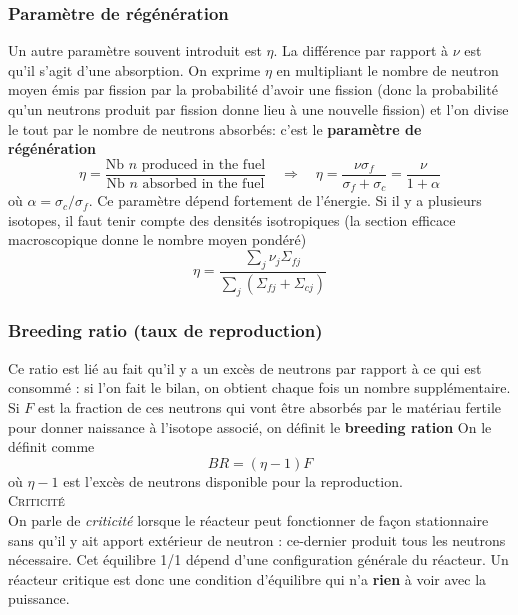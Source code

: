 \subsubsection{Paramètre de régénération}
Un autre paramètre souvent introduit est $\eta$. La différence par rapport à $\nu$ est qu'il 
s'agit d'une absorption. On exprime $\eta$ en multipliant le nombre de neutron moyen émis par
fission par la probabilité d'avoir une fission (donc la probabilité qu'un neutrons produit par 
fission donne lieu à une nouvelle fission) et l'on divise le tout par le nombre de neutrons
absorbés: c'est le \textbf{paramètre de régénération}
\begin{equation}
\eta = \dfrac{\text{Nb $n$ produced in the fuel}}{\text{Nb $n$ absorbed in the fuel}}\quad\Rightarrow
\quad \eta = \dfrac{\nu\sigma_f}{\sigma_f+\sigma_c}=\dfrac{\nu}{1+\alpha}
\end{equation}
où $\alpha = \sigma_c/\sigma_f$. Ce paramètre dépend fortement de l'énergie. Si il y a plusieurs 
isotopes, il faut tenir compte des densités isotropiques (la section efficace macroscopique donne
le nombre moyen pondéré)
\begin{equation}
\eta = \dfrac{\sum_j\nu_j\Sigma_{fj}}{\sum_j \left(\Sigma_{fj}+\Sigma_{cj}\right)}
\end{equation}


\subsubsection{Breeding ratio (taux de reproduction)}
Ce ratio est lié au fait qu'il y a un excès de neutrons par rapport à ce qui est consommé : si l'on 
fait le bilan, on obtient chaque fois un nombre supplémentaire. Si $F$ est la fraction de ces 
neutrons qui vont être absorbés par le matériau fertile pour donner naissance à l'isotope associé, 
on définit le \textbf{breeding ration}
On le définit comme
\begin{equation}
BR = (\eta-1)F
\end{equation}
où $\eta-1$ est l'excès de neutrons disponible pour la reproduction.\\

\textsc{Criticité}\\
On parle de \textit{criticité} lorsque le réacteur peut fonctionner de façon stationnaire sans 
qu'il y ait apport extérieur de neutron : ce-dernier produit tous les neutrons nécessaire. Cet 
équilibre 1/1 dépend d'une configuration générale du réacteur. Un réacteur critique est donc 
une condition d'équilibre qui n'a \textbf{rien} à voir avec la puissance.

